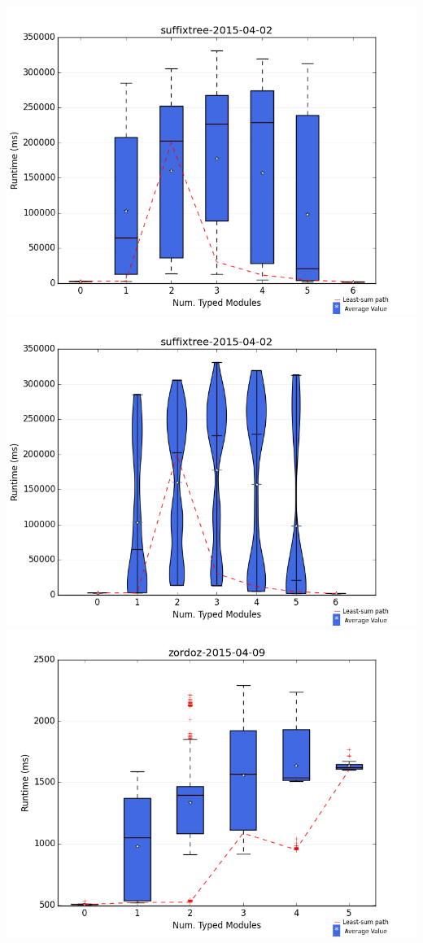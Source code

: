 \documentclass{article}
\begin{document}
\newpage
\includegraphics[width=\textwidth]{boxplots/suffixtree-2015-04-02-boxplot.png}
\includegraphics[width=\textwidth]{violins/suffixtree-2015-04-02-violin.png}
\newpage
\includegraphics[width=\textwidth]{boxplots/zordoz-2015-04-09-boxplot.png}
\end{document}
